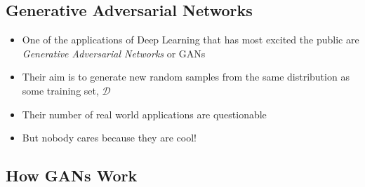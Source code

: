 \setcounter{outlineitem}{1}

\Outline %

\begin{slide}
\section{Generative Adversarial Networks}

\begin{PauseHighLight}
  \begin{itemize}
  \item One of the applications of Deep Learning that has most excited
    the public are \emph{Generative Adversarial Networks} or GANs\pause
  \item Their aim is to generate new random samples from the same
    distribution as some training set, $\mathcal{D}$\pause
  \item Their number of real world applications are\pause{}
    questionable\pauseb
  \item But nobody cares because they are cool!\pauseb 
  \end{itemize}
\end{PauseHighLight}


\end{slide}


\begin{slide}
\section{How GANs Work}

\pb\pause{}
\begin{center}
  \pause
\end{center}
\end{slide}



